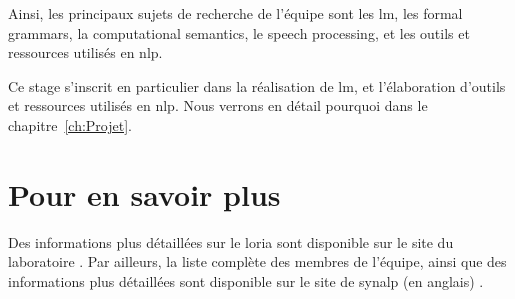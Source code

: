 Ainsi, les principaux sujets de recherche de l'équipe sont les \gls{lm}, les \gls{formal grammars}, la \gls{computational semantics}, le \gls{speech processing}, et les outils et ressources utilisés en \gls{nlp}.

Ce stage s'inscrit en particulier dans la réalisation de \gls{lm}, et l'élaboration d'outils et ressources utilisés en \gls{nlp}. Nous verrons en détail pourquoi dans le chapitre~\ref{ch:Projet}.

\section*{Pour en savoir plus}
Des informations plus détaillées sur le \gls{loria} sont disponible sur {le site du laboratoire \autocite{about_loria}}.
Par ailleurs, la liste complète des membres de l'équipe, ainsi que des informations plus détaillées sont disponible sur {le site de \gls{synalp} (en anglais) \autocite{about_synalp}}.